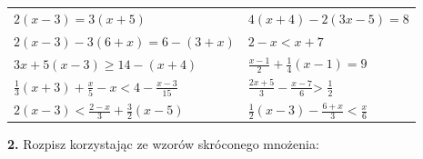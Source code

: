 \documentclass[12pt,a4paper]{article}
\theoremstyle{break}
\begin{document}
	\begin{enumerate}[a)] \begin{tabular}{p{7cm} p{7cm}} 
		\item $2(x-3)=3(x+5)$ & \vspace{0.25cm} 	\item$4(x+4)-2(3x-5)=8$ \\
		\item $2(x-3)-3(6+x)=6-(3+x)$ & 
		\item $2-x<x+7$ \\
		\item $3x+5(x-3)\geq 14-(x+4)$ & 
		\item $\frac{x-1}{2}+\frac{1}{4}(x-1)=9$ \\
		\item $\frac{1}{3}(x+3)+\frac{x}{5} - x < 4 - \frac{x-3}{15}$ & 
		\item $\frac{2x+5}{3}-\frac{x-7}{6}$> $\frac{1}{2}$ \\
		\item $2(x-3)<\frac{2-x}{3}+\frac{3}{2}(x-5)$ & 
		\item $\frac{1}{2}(x-3)-\frac{6+x}{3}<\frac{x}{6}$ \\
	\end{tabular} \end{enumerate}

\begin{mdframed}[style=zad]
		\vspace{0.2cm}
		\textbf{2.} Rozpisz korzystając ze wzorów skróconego mnożenia:
	\end{mdframed}
	
\end{document}

